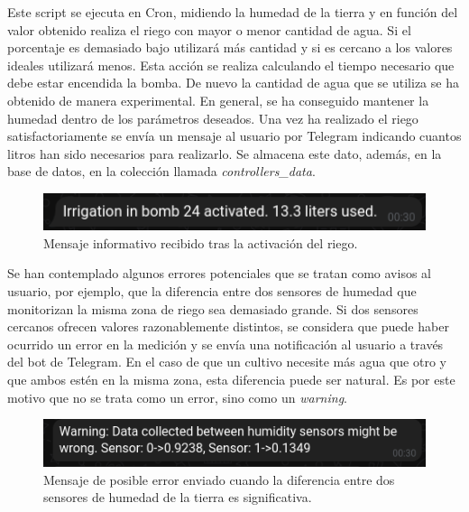 \documentclass[a4paper, 12pt, oneside]{book}
\begin{document}
Este script se ejecuta en Cron, midiendo la humedad de la tierra y en función del valor obtenido realiza el riego con mayor o menor cantidad de agua. Si el porcentaje es demasiado bajo utilizará más cantidad y si es cercano a los valores ideales utilizará menos. Esta acción se realiza calculando el tiempo necesario que debe estar encendida la bomba. De nuevo la cantidad de agua que se utiliza se ha obtenido de manera experimental. En general, se ha conseguido mantener la humedad dentro de los parámetros deseados.
Una vez ha realizado el riego satisfactoriamente se envía un mensaje al usuario por Telegram indicando cuantos litros han sido necesarios para realizarlo. Se almacena este dato, además, en la base de datos, en la colección llamada \textit{controllers\_data}.

\begin{figure}[H]
	\centering
    \includegraphics[width=12cm, keepaspectratio]{img/mensaje_riego}
    \caption{Mensaje informativo recibido tras la activación del riego.}
    \label{figura:mensaje riego}
\end{figure} 

Se han contemplado algunos errores potenciales que se tratan como avisos al usuario, por ejemplo, que la diferencia entre dos sensores de humedad que monitorizan la misma zona de riego sea demasiado grande. 
Si dos sensores cercanos ofrecen valores razonablemente distintos, se considera que puede haber ocurrido un error en la medición y se envía una notificación al usuario a través del bot de Telegram.
En el caso de que un cultivo necesite más agua que otro y que ambos estén en la misma zona, esta diferencia puede ser natural. Es por este motivo que no se trata como un error, sino como un \textit{warning}.

\begin{figure}[H]
	\centering
    \includegraphics[width=12cm, keepaspectratio]{img/warning_humedad_tierra}
    \caption{Mensaje de posible error enviado cuando la diferencia entre dos sensores de humedad de la tierra es significativa.}
    \label{figura:diferencia de sensores}
\end{figure}
\end{document}
